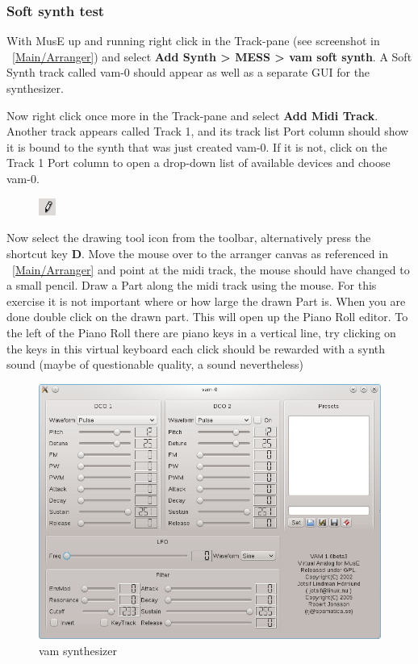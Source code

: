 \documentclass[a4paper]{report}
\newcommand{\key}[1]{\textbf{#1}}
\newcommand{\menu}[1]{\textbf{#1}}
\begin{document}
\subsubsection{Soft synth test}
With MusE up and running right click in the Track-pane (see screenshot in
~\ref{Main/Arranger}) and select \menu{Add Synth > MESS > vam soft synth}.
A Soft Synth track called vam-0 should appear as well as a separate GUI
for the synthesizer.

Now right click once more in the Track-pane and select \menu{Add Midi
Track}. Another track appears called Track 1, and its track list Port
column should show it is bound to the synth that was just created vam-0.
If it is not, click on the Track 1 Port column to open a drop-down list
of available devices and choose vam-0.
\begin{figure}
\includegraphics[width=0.05\textwidth]{pics/arrow_tool}
\end{figure}
Now select the drawing tool icon
from the toolbar, alternatively press the shortcut key \key{D}.
Move the mouse over to the arranger canvas as referenced in ~\ref{Main/Arranger}
and point at the midi track, the mouse should have changed to a small pencil.
Draw a Part along the midi track using the mouse. For this exercise it is
not important where or how large the drawn Part is. When you are done double
click on the drawn part. This will open up the Piano Roll editor. To the
left of the Piano Roll there are piano keys in a vertical line, try clicking
on the keys in this virtual keyboard each click should be rewarded with a
synth sound (maybe of questionable quality, a sound nevertheless) 
\begin{figure}[htp]
\centering \includegraphics[width=.5\textwidth]{pics/vam_synth}
\caption{vam synthesizer}
\label{fig:vam_synth}
\end{figure}
\end{document}
